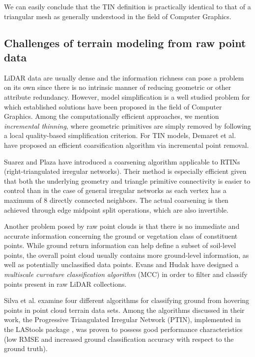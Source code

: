 \documentclass[graybox]{svmult}
\begin{document}
	We can easily conclude that the TIN definition is practically identical to that of a triangular mesh as generally understood in the field of Computer Graphics.
	
	
	\subsection{Challenges of terrain modeling from raw point data}
	LiDAR data are usually dense and the information richness can pose a problem on its own since there is no intrinsic manner of reducing geometric or other attribute redundancy.
	However, model simplification is a well studied problem for which established solutions have been proposed in the field of Computer Graphics. Among the computationally efficient
	approaches, we mention \emph{incremental thinning}, where geometric primitives are simply removed by following a local quality-based simplification criterion. For TIN models,
	Demaret et al. \cite{Demaret2005} have proposed an efficient coarsification algorithm via incremental point removal.
	
	Suarez and Plaza \cite{Suarez2009} have introduced a coarsening algorithm applicable to RTINs (right-triangulated irregular networks). Their method is especially efficient
	given that both the underlying geometry and triangle primitive connectivity is easier to control than in the case of general irregular networks as each vertex has a maximum of
	8 directly connected neighbors. The actual coarsening is then achieved through edge midpoint split operations, which are also invertible.
	
	Another problem posed by raw point clouds is that there is no immediate and accurate information concerning the ground or vegetation class of constituent points.
	While ground return information can help define a subset of soil-level points, the overall point cloud usually contains more ground-level information, as well as potentially
	unclassified data points.
	Evans and Hudak \cite{Evans2007} have designed a \emph{multiscale curvature classification algorithm} (MCC) in order to filter and classify points present in raw LiDAR collections.
	
	Silva et al. \cite{Silva2018} examine four different algorithms for classifying ground from hovering points in point cloud terrain data sets. Among the algorithms discussed 
	in their work, the Progressive Triangulated Irregular Network (PTIN), implemented in the LAStools package \cite{Isenburg2015}, was proven to possess good performance characteristics
	(low RMSE and increased ground classification accuracy with respect to the ground truth). 
	
\end{document}
